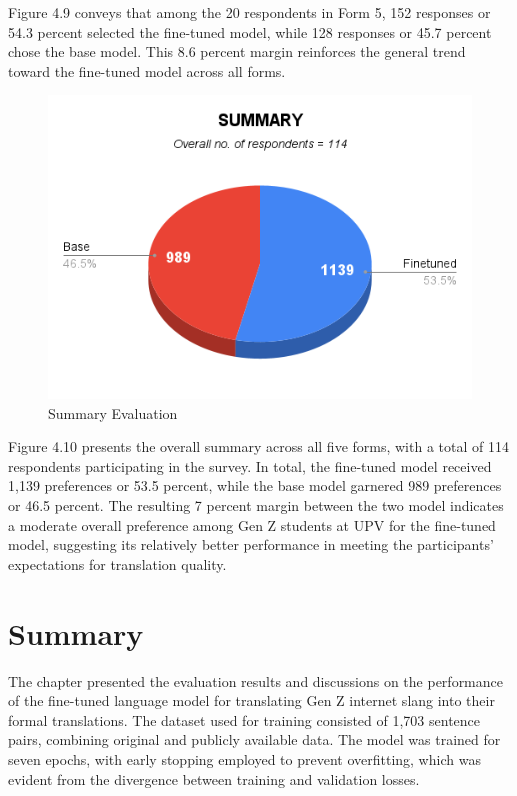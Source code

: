Figure 4.9 conveys that among the 20 respondents in Form 5, 152 responses or 54.3 percent selected the fine-tuned model, while 128 responses or 45.7 percent chose the base model. This 8.6 percent margin reinforces the general trend toward the fine-tuned model across all forms. 

\begin{figure}[H]
	\centering
	\includegraphics[scale=0.7]{figures/Summary.png}
	\caption{Summary Evaluation}
\end{figure}

Figure 4.10 presents the overall summary across all five forms, with a total of 114 respondents participating in the survey. In total, the fine-tuned model received 1,139 preferences or 53.5 percent, while the base model garnered 989 preferences or 46.5 percent. The resulting 7 percent margin between the two model indicates a moderate overall preference among Gen Z students at UPV for the fine-tuned model, suggesting its relatively better performance in meeting the participants' expectations for translation quality. 

\section{Summary}
The chapter presented the evaluation results and discussions on the performance of the fine-tuned language model for translating Gen Z internet slang into their formal translations. The dataset used for training consisted of 1,703 sentence pairs, combining original and publicly available data. The model was trained for seven epochs, with early stopping employed to prevent overfitting, which was evident from the divergence between training and validation losses.

